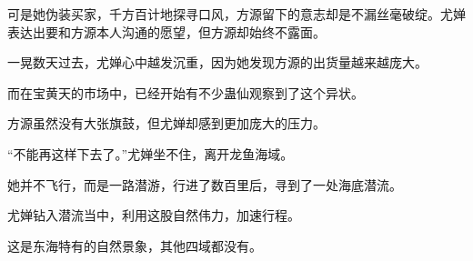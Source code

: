 \begin{this_body}
可是她伪装买家，千方百计地探寻口风，方源留下的意志却是不漏丝毫破绽。尤婵表达出要和方源本人沟通的愿望，但方源却始终不露面。

一晃数天过去，尤婵心中越发沉重，因为她发现方源的出货量越来越庞大。

而在宝黄天的市场中，已经开始有不少蛊仙观察到了这个异状。

方源虽然没有大张旗鼓，但尤婵却感到更加庞大的压力。

“不能再这样下去了。”尤婵坐不住，离开龙鱼海域。

她并不飞行，而是一路潜游，行进了数百里后，寻到了一处海底潜流。

尤婵钻入潜流当中，利用这股自然伟力，加速行程。

这是东海特有的自然景象，其他四域都没有。

\end{this_body}

